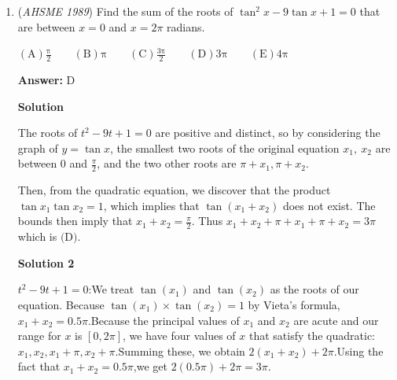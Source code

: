 \begin{enumerate}
 But this is $\left(\frac{k^2}{1-k^2}\right)^2\cdot\frac{k}{1-k}\ =\ k^5\cdot\left(\frac{1}{1-k}\right)^3\cdot\left(\frac{1}{1+k}\right)^2\ =\ k^5\cdot(1+k)\cdot\left(\frac{1}{1-k^2}\right)^3$
$=k^5(1+k)(\tbinom{2}{2}+\tbinom{3}{2}k^2+\tbinom{4}{2}k^4+\tbinom{5}{2}k^6+...)$, the last part having general term $\tbinom{j}{2}k^{2j-4}$from which it is easy to see that, since $\tbinom{8}{2}=28$, the last part contains the term $28k^{12}$ and the whole result $28k^{17}+28k^{18}$. So the answer is $\mathrm{(D)}$.

 


 



\textbf{Solution 2}

Suppose $n$ is even. Thus $z$ is even, so let $z=2t$. Hence $x+y+t=\frac{n}{2}$. By stars and bars, this has
 \[\binom{\frac{n}{2}-1}{3-1}\]solutions. This implies that $\frac{n}{2}-1=8\to n=18$. If $z$ is odd, let $z=2t-1$. Then $x+y+t=\frac{n+1}{2}$, in which $n=17$ is a solution. The answer is then $\mathrm{(D)}$.

 


	\item (\textit{AHSME 1989}) Find the sum of the roots of $\tan^2x-9\tan x+1=0$ that are between $x=0$ and $x=2\pi$ radians.


 $\mathrm{(A)  \frac{\pi}{2} } \qquad \mathrm{(B) \pi } \qquad \mathrm{(C) \frac{3\pi}{2} } \qquad \mathrm{(D) 3\pi } \qquad \mathrm{(E) 4\pi }$

 \textbf{Answer: }D



\textbf{Solution}

The roots of $t^2-9t+1=0$ are positive and distinct, so by considering the graph of $y=\tan x$, the smallest two roots of the original equation $x_1,\ x_2$ are between $0$ and $\frac\pi{2}$, and the two other roots are $\pi+x_1, \pi+x_2$.

 Then, from the quadratic equation, we discover that the product $\tan x_1\tan x_2=1$, which implies that $\tan(x_1+x_2)$ does not exist. The bounds then imply that $x_1+x_2=\frac\pi{2}$. Thus $x_1+x_2+\pi+x_1+\pi+x_2=3\pi$ which is $\textrm{(D)}$.

 



\textbf{Solution 2}

$t^2-9t+1=0$:We treat $\tan(x_1)$ and $\tan(x_2)$ as the roots of our equation. Because $\tan(x_1) \times \tan(x_2) = 1$ by Vieta's formula, $x_1 + x_2 = 0.5\pi$.Because the principal values of $x_1$ and $x_2$ are acute and our range for $x$ is $[0,2\pi]$, we have four values of $x$ that satisfy the quadratic:$x_1, x_2, x_1+\pi, x_2+\pi.$Summing these, we obtain $2(x_1+x_2) + 2\pi$.Using the fact that $x_1+x_2=0.5\pi$,we get $2(0.5\pi) + 2\pi = 3\pi.$




\end{enumerate}
